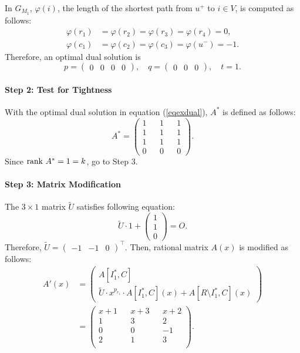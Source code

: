 \begin{example}
In $ G_{M_1} $, $ \varphi (i) $, the length of the shortest path from $ u^{+} $ to $ i \in V $, is computed as follows:
\begin{align*}
\varphi (r_1) &= \varphi (r_2) = \varphi (r_3) = \varphi (r_4) = 0,\\
\varphi (c_1) &= \varphi (c_2) = \varphi (c_3) = \varphi (u^{-}) = -1.
\end{align*}
Therefore, an optimal dual solution is 
\begin{equation}
p = \begin{pmatrix} 0 & 0 & 0 & 0 \end{pmatrix}, \quad
q = \begin{pmatrix} 0 & 0 & 0 \end{pmatrix}, \quad
t   = 1. \label{eqexdual}
\end{equation}

\paragraph{Step 2: Test for Tightness\\}
With the optimal dual solution in equation (\ref{eqexdual}), $ A^{\ast} $ is defined as follows:
\begin{equation}
A^{\ast} = \left( \begin{array}{ccccc}
1 & & 1 & & 1 \\ 1 & & 1 & & 1 \\ 1 & & 1 & & 1 \\ 0 & & 0 & & 0 
\end{array} \right).
\end{equation}
Since $ \mathrm{rank} \  A^{\ast} = 1 = k $, go to Step 3.

\paragraph{Step 3: Matrix Modification\\}
The $ 3 \times 1 $ matrix $ \tilde{U} $ satisfies following equation:
\[ \tilde{U} \cdot 1 + \begin{pmatrix} 1 \\ 1 \\ 0 \end{pmatrix} = O. \]
Therefore, $ \tilde{U} = \begin{pmatrix} -1 & -1 & 0 \end{pmatrix}^{\top} $. Then, rational matrix $ A(x) $ is modified as follows:
\begin{align*}
A'(x) &= \begin{pmatrix} A[I^{\ast}_1 , C] \\ \tilde{U} \cdot x^{p_{r_1}} \cdot A[I^{\ast}_1,C] (x) + A[R \setminus I^{\ast}_1 , C] (x)  \end{pmatrix}\\
&=  \left( \begin{array}{ccccc}
x+1 & & x+3 & & x+2 \\ 1 & & 3 & & 2 \\ 0 & & 0 & & -1 \\ 2 & & 1 & & 3 \\
\end{array} \right).
\end{align*}


\end{example}
